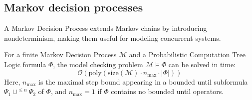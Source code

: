 \subsection{Markov decision processes}
A Markov Decision Process extends Markov chains by introducing nondeterminism, making them useful for modeling concurrent systems.
\begin{theorem}
    For a finite Markov Decision Process $\mathcal{M}$ and a Probabilistic Computation Tree Logic formula $\Phi$, the model checking problem $\mathcal{M} \models \Phi$ can be solved in time:
       \[\mathcal{O}\left(\text{poly}\left(\text{size}\left(\mathcal{M}\right)\cdot n_{\max}\cdot\left\lvert \Phi\right\rvert\right)\right)\]
    Here, $n_{\max}$ is the maximal step bound appearing in a bounded until subformula $\Psi_1\cup^{\leq n}\Psi_2$ of $\Phi$, and $n_{\max}=1$ if $\Phi$ contains no bounded until operators.
\end{theorem}